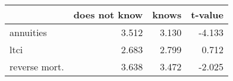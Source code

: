 \begin{tabular}{lrrr}
\toprule
{} &  does not know &  knows &  t-value \\
\midrule
annuities     &          3.512 &  3.130 &   -4.133 \\
ltci          &          2.683 &  2.799 &    0.712 \\
reverse mort. &          3.638 &  3.472 &   -2.025 \\
\bottomrule
\end{tabular}
